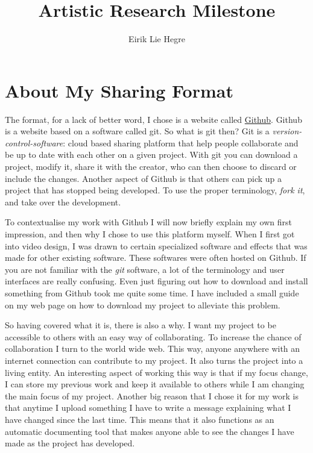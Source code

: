 \documentclass[12pt, letterpaper]{article}
\title{Artistic Research Milestone}
\author{Eirik Lie Hegre}
\begin{document}
\maketitle

\section{About My Sharing Format}
The format, for a lack of better word, I chose is a website called
\href{https://github.com}{Github}. Github is a website based on a software
called git. So what is git then? Git is a \textit{version-control-software}:
cloud based sharing platform that help people
collaborate and be up to date with each other on a given project. With
git you can download a project, modify it, share it with the creator, who can
then choose to discard or include the changes. Another aspect of Github is that
others can pick up a project that has stopped being developed. To use the proper
terminology, \textit{fork it}, and take over the development.
\par
To contextualise my work with Github I will now briefly explain my own first
impression, and then why I chose to use this platform myself. When I first got
into video design, I was drawn to certain specialized software and effects
that was made for other existing software. These softwares were often hosted on
Github. If you are not familiar with the \textit{git} software,
 a lot of the terminology and
user interfaces are really confusing. Even just figuring out how to download
and install something from Github took me quite some time. I have included a
small guide on my web page on how to download my project to alleviate this
problem.
\par
So having covered what it is, there is also a why. I want my project to be
accessible to others with an easy way of collaborating. To increase the chance of
collaboration I turn to the world wide web. This way, anyone anywhere with an
internet connection can contribute to my project. It also turns the project into
a living entity. An interesting aspect of working this way is that if my
focus change, I can store my previous work and keep it available to others
while I am changing the main focus of my project.
Another big reason that I chose it for my work is that anytime I upload
something I have to write a message explaining what I have changed since the
last time. This means that it also functions as an automatic documenting tool
that makes anyone able to see the changes I have made as the project has
developed.
\end{document}
